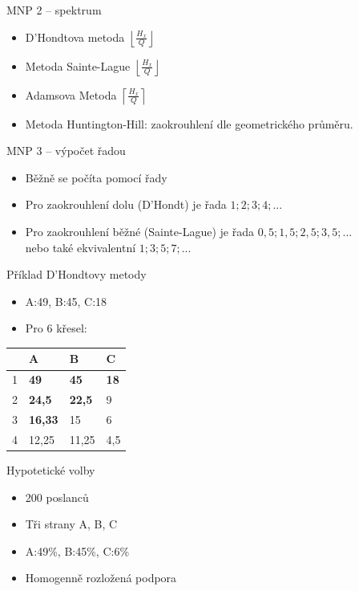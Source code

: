 \documentclass[17pt]{beamer}
\begin{document}
\begin{frame}{MNP 2 -- spektrum}
\begin{itemize}
\item D'Hondtova metoda $\left\lfloor\frac{H_{x}}{Q}\right\rfloor$
\item Metoda Sainte-Lague $\left\lfloor\frac{H_{x}}{Q}\right\rfloor$
\item Adamsova Metoda $\left\lceil\frac{H_{x}}{Q}\right\rceil$
\item Metoda Huntington-Hill: zaokrouhlení dle geometrického průměru.
\end{itemize}
\end{frame}

\begin{frame}{MNP 3 -- výpočet řadou}
\begin{itemize}
\item Běžně se počíta pomocí řady 
\item Pro zaokrouhlení dolu (D'Hondt) je řada $1; 2; 3; 4; ...$
\item Pro zaokrouhlení běžné (Sainte-Lague) je řada $0{,}5; 1{,}5; 2{,}5; 3{,}5; ...$
\\ nebo také ekvivalentní $1; 3; 5; 7; ...$
\end{itemize}
\end{frame}

\begin{frame}{Příklad D'Hondtovy metody}
\begin{itemize}
\item A:49, B:45, C:18
\item Pro 6 křesel:
\end{itemize}
\begin{center}
\begin{tabular}{|C{2cm}|C{2cm}|C{2cm}|C{2cm}|}
\hline 
 & A & B & C \\ 
 & \textbf{49} & \textbf{45} & \textbf{18} \\ 
 & \textbf{24,5} & \textbf{22,5} & 9 \\ 
 & \textbf{16,33} & 15 & 6 \\ 
 & 12,25 & 11,25 & 4,5 \\ 
\hline 
\end{tabular} 
\end{center}
\end{frame}

\begin{frame}{Hypotetické volby}
\begin{itemize}
\item 200 poslanců
\item Tři strany A, B, C
\item A:49\%, B:45\%, C:6\%
\item Homogenně rozložená podpora
\end{itemize}
\end{frame}
\end{document}
